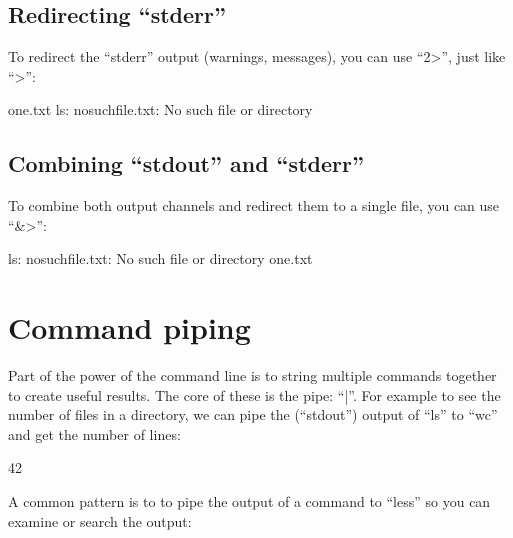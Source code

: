 \begin{prompt}
\end{prompt}

\subsection{Redirecting ``stderr''}

To redirect the ``stderr'' output (warnings, messages), you can use ``2>'', just like ``>'':

\begin{prompt}
  one.txt
  ls: nosuchfile.txt: No such file or directory
\end{prompt}

\subsection{Combining ``stdout'' and ``stderr''}

To combine both output channels and redirect them to a single file, you can use ``&>'':

\begin{prompt}
  ls: nosuchfile.txt: No such file or directory
  one.txt
\end{prompt}

\section{Command piping}

Part of the power of the command line is to string multiple commands together to create useful results. The core of these is the pipe: ``|''. For example to see the number of files in a directory, we can pipe the (``stdout'') output of ``ls'' to ``wc'' and get the number of lines:

\begin{prompt}
         42
\end{prompt}

A common pattern is to to pipe the output of a command to ``less'' so you can examine or search the output:

\begin{prompt}
\end{prompt}

